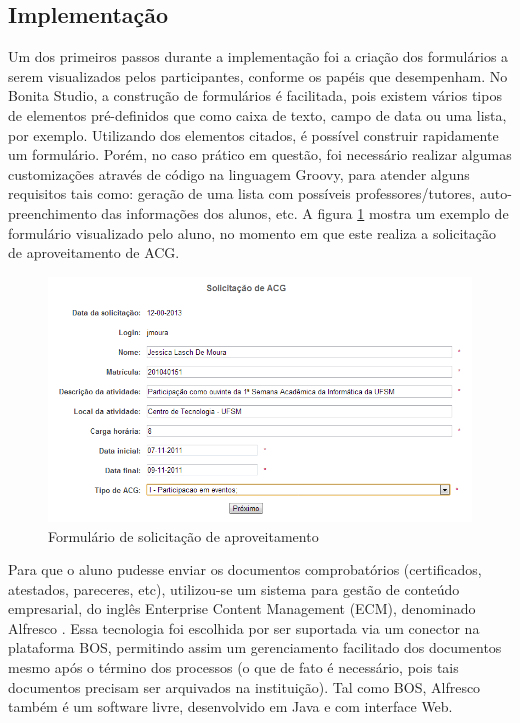 \documentclass[12pt]{article}
\begin{document}
\subsection{Implementação}


Um dos primeiros passos durante a implementação foi a criação dos formulários a serem visualizados pelos participantes, conforme os papéis que desempenham. No Bonita Studio, a construção de formulários é facilitada, pois existem vários tipos de elementos pré-definidos que como caixa de texto, campo de data ou uma lista, por exemplo. Utilizando dos elementos citados, é possível construir rapidamente um formulário. Porém, no caso prático em questão, foi necessário realizar algumas customizações através de código na linguagem Groovy, para atender alguns requisitos tais como: geração de uma lista com possíveis professores/tutores, auto-preenchimento das informações dos alunos, etc. A figura \ref{fig:form}  mostra um exemplo de formulário visualizado pelo aluno, no momento em que este realiza a solicitação de aproveitamento de ACG.

\begin{figure}[ht]
\centering
\includegraphics[width=.9\textwidth]{images/formSolicitacao.png}
\caption{Formulário de solicitação de aproveitamento}
\label{fig:form}
\end{figure}

Para que o aluno pudesse enviar os documentos comprobatórios (certificados, atestados, pareceres, etc), utilizou-se um sistema para gestão de conteúdo empresarial, do inglês Enterprise Content Management (ECM), denominado Alfresco \cite{ALFRESCO}. Essa tecnologia foi escolhida por ser suportada via um conector na plataforma BOS, permitindo assim um gerenciamento facilitado dos documentos mesmo após o término dos processos (o que de fato é necessário, pois tais documentos precisam ser arquivados na instituição). Tal como BOS, Alfresco também é um software livre, desenvolvido em Java e com interface Web.
\end{document}

